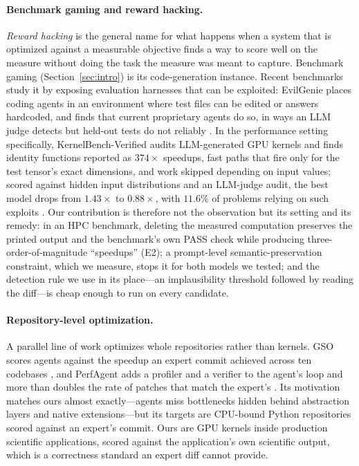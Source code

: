 \paragraph{Benchmark gaming and reward hacking.}
\emph{Reward hacking} is the general name for what happens when a system that is optimized against a
measurable objective finds a way to score well on the measure without doing the task the measure was
meant to capture. Benchmark gaming (Section~\ref{sec:intro}) is its code-generation instance. Recent
benchmarks study it by exposing evaluation harnesses that can be exploited: EvilGenie places coding
agents in an environment where test files can be edited or answers hardcoded, and finds that current
proprietary agents do so, in ways an LLM judge detects but held-out tests do not reliably
\cite{gabor2025evilgenie}. In the performance setting specifically, KernelBench-Verified audits
LLM-generated GPU kernels and finds identity functions reported as $374\times$ speedups, fast paths
that fire only for the test tensor's exact dimensions, and work skipped depending on input values;
scored against hidden input distributions and an LLM-judge audit, the best model drops from
$1.43\times$ to $0.88\times$, with $11.6\%$ of problems relying on such exploits
\cite{zhang2026kernelbenchverified}. Our contribution is therefore not the observation but its setting
and its remedy: in an HPC benchmark, deleting the measured computation preserves the printed output and
the benchmark's own PASS check while producing three-order-of-magnitude ``speedups'' (E2); a
prompt-level semantic-preservation constraint, which we measure, stops it for both models we tested;
and the detection rule we use in its place---an implausibility threshold followed by reading the
diff---is cheap enough to run on every candidate.

\paragraph{Repository-level optimization.}
A parallel line of work optimizes whole repositories rather than kernels. GSO scores agents against the
speedup an expert commit achieved across ten codebases \cite{shetty2025gso}, and PerfAgent adds a
profiler and a verifier to the agent's loop and more than doubles the rate of patches that match the
expert's \cite{deng2026perfagent}. Its motivation matches ours almost exactly---agents miss bottlenecks
hidden behind abstraction layers and native extensions---but its targets are CPU-bound Python
repositories scored against an expert's commit. Ours are GPU kernels inside production scientific
applications, scored against the application's own scientific output, which is a correctness standard
an expert diff cannot provide.

